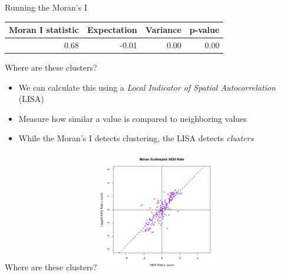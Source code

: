 \documentclass[aspectratio = 169, 12pt]{beamer}\usepackage[]{graphicx}\usepackage[]{color}
\newenvironment{knitrout}{}{} %
\begin{document}
\begin{frame}[fragile]{Running the Moran's I}
\begin{table}[ht]
\centering
\begin{tabular}{rrrr}
  \hline
Moran I statistic & Expectation & Variance & p-value \\ 
  \hline
0.68 & -0.01 & 0.00 & 0.00 \\ 
   \hline
\end{tabular}
\label{tab:moranresid}
\end{table}

\end{frame}

\begin{frame}{Where are these clusters?}
\begin{itemize}
\item We can calculate this using a \textit{Local Indicator of Spatial Autocorrelation} (LISA)
\item Measure how similar a value is compared to neighboring values
\item While the Moran's I detects clustering, the LISA detects \textit{clusters}
\end{itemize}
\end{frame}

\begin{frame}[fragile]{Where are these clusters?}
\begin{knitrout}
\color{fgcolor}
\includegraphics[width=200px]{figure/unnamed-chunk-6-1} 

\end{knitrout}
\end{frame}
\end{document}
